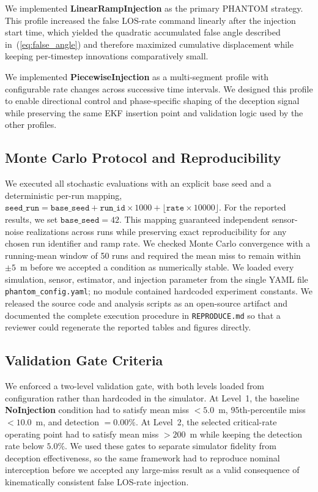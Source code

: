 \documentclass[journal]{IEEEtran}
\begin{document}
We implemented \textbf{LinearRampInjection} as the primary PHANTOM
strategy.  This profile increased the false LOS-rate command linearly
after the injection start time, which yielded the quadratic
accumulated false angle described in~(\ref{eq:false_angle}) and
therefore maximized cumulative displacement while keeping
per-timestep innovations comparatively small.

We implemented \textbf{PiecewiseInjection} as a multi-segment
profile with configurable rate changes across successive time
intervals.  We designed this profile to enable directional control
and phase-specific shaping of the deception signal while preserving
the same EKF insertion point and validation logic used by the other
profiles.

\subsection{Monte Carlo Protocol and Reproducibility}
We executed all stochastic evaluations with an explicit base seed and
a deterministic per-run mapping,
$\texttt{seed\_run} = \texttt{base\_seed} + \texttt{run\_id} \times 1000
+ \lfloor \texttt{rate} \times 10000 \rfloor$.  For the reported
results, we set $\texttt{base\_seed} = 42$.  This mapping guaranteed
independent sensor-noise realizations across runs while preserving
exact reproducibility for any chosen run identifier and ramp rate.
We checked Monte Carlo convergence with a running-mean window of
50 runs and required the mean miss to remain within $\pm 5$~m before
we accepted a condition as numerically stable.  We loaded every
simulation, sensor, estimator, and injection parameter from the
single YAML file \texttt{phantom\_config.yaml}; no module contained
hardcoded experiment constants.  We released the source code and
analysis scripts as an open-source artifact and documented the
complete execution procedure in \texttt{REPRODUCE.md} so that a
reviewer could regenerate the reported tables and figures directly.

\subsection{Validation Gate Criteria}
We enforced a two-level validation gate, with both levels loaded from
configuration rather than hardcoded in the simulator.  At Level~1, the
baseline \textbf{NoInjection} condition had to satisfy mean miss
$< 5.0$~m, $95$th-percentile miss $< 10.0$~m, and detection
$= 0.00\%$.  At Level~2, the selected critical-rate operating point
had to satisfy mean miss $> 200$~m while keeping the detection rate
below $5.0\%$.  We used these gates to separate simulator fidelity
from deception effectiveness, so the same framework had to reproduce
nominal interception before we accepted any large-miss result as a
valid consequence of kinematically consistent false LOS-rate
injection.
\end{document}
